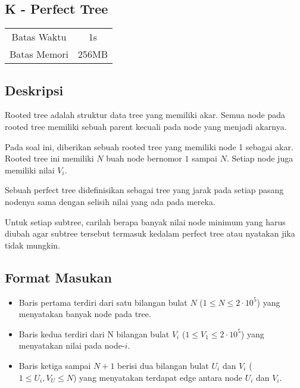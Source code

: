 \documentclass{article}
\begin{document}
\begin{center}
    \section*{K - Perfect Tree} %

    \begin{tabular}{ | c c | }
        \hline
        Batas Waktu  & 1s \\    %
        Batas Memori & 256MB \\  %
        \hline
    \end{tabular}
\end{center}

\subsection*{Deskripsi}

Rooted tree adalah struktur data tree yang memiliki akar. Semua node pada rooted tree memiliki sebuah parent kecuali pada node yang menjadi akarnya.

Pada soal ini, diberikan sebuah rooted tree yang memiliki node 1 sebagai akar. Rooted tree ini memiliki $N$ buah node bernomor $1$ sampai $N$. Setiap node juga memiliki nilai $V_i$.

Sebuah perfect tree didefinisikan sebagai tree yang jarak pada setiap pasang nodenya sama dengan selisih nilai yang ada pada mereka.

Untuk setiap subtree, carilah berapa banyak nilai node minimum yang harus diubah agar subtree tersebut termasuk kedalam perfect tree atau nyatakan jika tidak mungkin.


\subsection*{Format Masukan}

\begin{itemize}
    \item Baris pertama terdiri dari satu bilangan bulat $N$ ($1 \leq N \leq 2 \cdot 10^5$) yang menyatakan banyak node pada tree.
    \item Baris kedua terdiri dari N bilangan bulat $V_i$ ($1 \leq V_1 \leq 2 \cdot 10^5$) yang menyatakan nilai pada node-$i$.
    \item Baris ketiga sampai $N + 1$ berisi dua bilangan bulat $U_i$ dan $V_i$ ($1 \leq U_i, V_U \leq N$) yang menyatakan terdapat edge antara node $U_i$ dan $V_i$.
\end{itemize}
\end{document}
